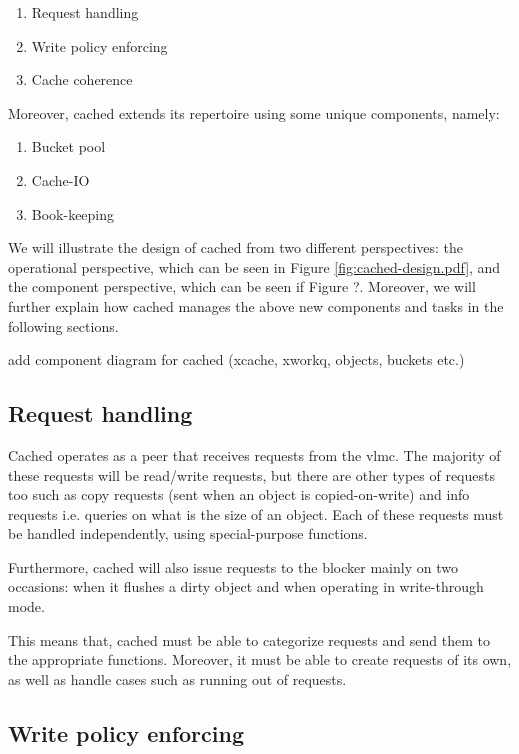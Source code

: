 \begin{enumerate}
	\item Request handling
	\item Write policy enforcing
	\item Cache coherence
\end{enumerate}

Moreover, cached extends its repertoire using some unique components, namely:

\begin{enumerate}
	\item Bucket pool
	\item Cache-IO
	\item Book-keeping
\end{enumerate}

We will illustrate the design of cached from two different perspectives: the 
operational perspective, which can be seen in Figure 
\ref{fig:cached-design.pdf}, and the component perspective, which can be seen 
if Figure ?. Moreover, we will further explain how cached manages the above new 
components and tasks in the following sections.

\fixme add component diagram for cached (xcache, xworkq, objects, buckets etc.)

\subsection{Request handling}

Cached operates as a peer that receives requests from the vlmc. The majority of 
these requests will be read/write requests, but there are other types of 
requests too such as copy requests (sent when an object is copied-on-write) and 
info requests i.e. queries on what is the size of an object. Each of these 
requests must be handled independently, using special-purpose functions.

Furthermore, cached will also issue requests to the blocker mainly on two 
occasions: when it flushes a dirty object and when operating in write-through 
mode.

This means that, cached must be able to categorize requests and send them to 
the appropriate functions. Moreover, it must be able to create requests of its 
own, as well as handle cases such as running out of requests.

\subsection{Write policy enforcing}\label{sec:cached-wcp-design}

